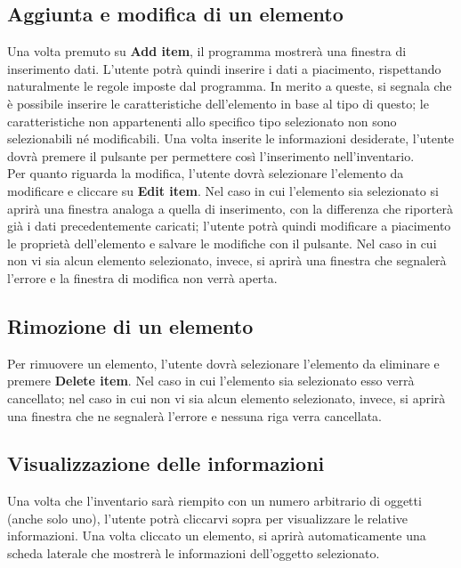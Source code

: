 \subsection{Aggiunta e modifica di un elemento}
Una volta premuto su \textbf{Add item}, il programma mostrerà una finestra di inserimento dati. L'utente potrà quindi inserire i dati a piacimento, rispettando naturalmente le regole imposte dal programma. In merito a queste, si segnala che è possibile inserire le caratteristiche dell'elemento in base al tipo di questo; le caratteristiche non appartenenti allo specifico tipo selezionato non sono selezionabili né modificabili. Una volta inserite le informazioni desiderate, l'utente dovrà premere il pulsante per permettere così l'inserimento nell'inventario. \\
Per quanto riguarda la modifica, l'utente dovrà selezionare l'elemento da modificare e cliccare su \textbf{Edit item}. Nel caso in cui l'elemento sia selezionato si aprirà una finestra analoga a quella di inserimento, con la differenza che riporterà già i dati precedentemente caricati; l'utente potrà quindi modificare a piacimento le proprietà dell'elemento e salvare le modifiche con il pulsante. Nel caso in cui non vi sia alcun elemento selezionato, invece, si aprirà una finestra che segnalerà l'errore e la finestra di modifica non verrà aperta.

\subsection{Rimozione di un elemento}
Per rimuovere un elemento, l'utente dovrà selezionare l'elemento da eliminare e premere \textbf{Delete item}. Nel caso in cui l'elemento sia selezionato esso verrà cancellato; nel caso in cui non vi sia alcun elemento selezionato, invece, si aprirà una finestra che ne segnalerà l'errore e nessuna riga verra cancellata.

\subsection{Visualizzazione delle informazioni}
Una volta che l'inventario sarà riempito con un numero arbitrario di oggetti (anche solo uno), l'utente potrà cliccarvi sopra per visualizzare le relative informazioni. Una volta cliccato un elemento, si aprirà automaticamente una scheda laterale che mostrerà le informazioni dell'oggetto selezionato.
